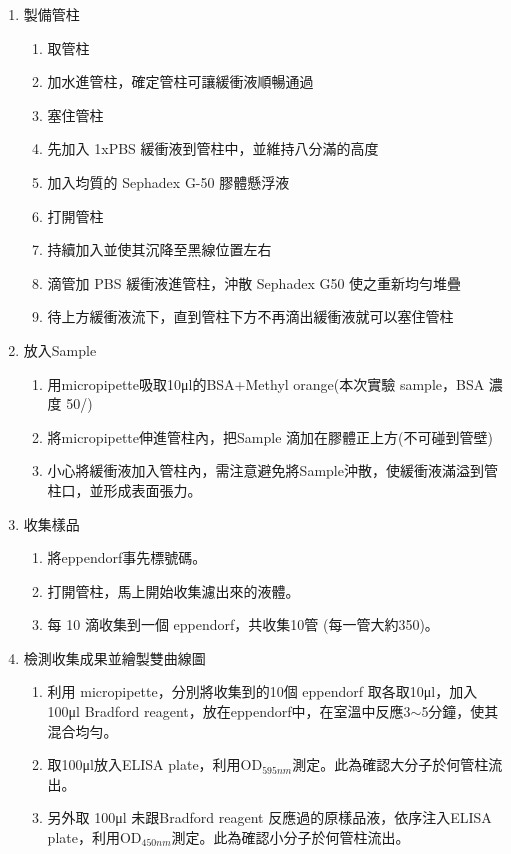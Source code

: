 \begin{enumerate}[label=\arabic*.]
  \item 製備管柱
  \begin{enumerate}[label=(\arabic*)]
    \item 取管柱
  
    \item 加水進管柱，確定管柱可讓緩衝液順暢通過
    \item 塞住管柱
    \item 先加入 1xPBS 緩衝液到管柱中，並維持八分滿的高度
    \item 加入均質的 Sephadex G-50 膠體懸浮液
    \item 打開管柱
    \item 持續加入並使其沉降至黑線位置左右
    \item 滴管加 PBS 緩衝液進管柱，沖散 Sephadex G50 使之重新均勻堆疊
    \item 待上方緩衝液流下，直到管柱下方不再滴出緩衝液就可以塞住管柱
  \end{enumerate}
  \item 放入Sample
  \begin{enumerate}[label=(\arabic*)]
    \item 用micropipette吸取10μl的BSA+Methyl orange(本次實驗 sample，BSA 濃度 50\mug/\mul)
    \item 將micropipette伸進管柱內，把Sample 滴加在膠體正上方(不可碰到管壁)
    \item 小心將緩衝液加入管柱內，需注意避免將Sample沖散，使緩衝液滿溢到管柱口，並形成表面張力。
  \end{enumerate}
  \item 收集樣品
  \begin{enumerate}[label=(\arabic*)]
    \item 將eppendorf事先標號碼。
    \item 打開管柱，馬上開始收集濾出來的液體。
    \item 每 10 滴收集到一個 eppendorf，共收集10管 (每一管大約350\mul)。
  \end{enumerate}
  \item 檢測收集成果並繪製雙曲線圖
  \begin{enumerate}[label=(\arabic*)]
    \item 利用 micropipette，分別將收集到的10個 eppendorf 取各取10μl，加入 100μl Bradford reagent，放在eppendorf中，在室溫中反應3$\sim$5分鐘，使其混合均勻。
    \item 取100μl放入ELISA plate，利用OD$_{595nm}$測定。此為確認大分子於何管柱流出。
    \item 另外取 100μl 未跟Bradford reagent 反應過的原樣品液，依序注入ELISA plate，利用OD$_{450nm}$測定。此為確認小分子於何管柱流出。

\end{enumerate}
\end{enumerate}
